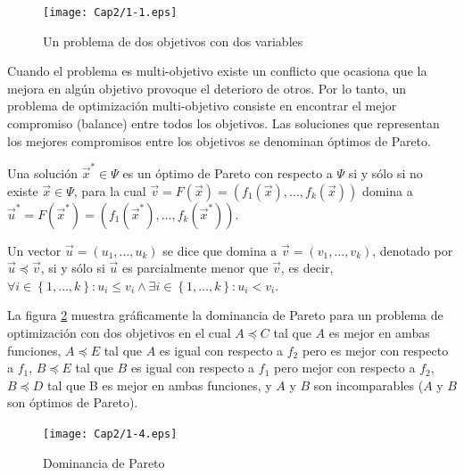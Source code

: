       \begin{figure}
	\centering
	\texttt{[image: Cap2/1-1.eps]}
	  \caption{Un problema de dos objetivos con dos variables}
      \label{fig:multiobj}
      \end{figure}
            
      Cuando el problema es multi-objetivo existe un conflicto que ocasiona que la mejora en alg\'un objetivo provoque 
      el deterioro de otros. Por lo tanto, un problema de optimizaci\'on multi-objetivo consiste en encontrar el mejor 
      compromiso (balance) entre todos los objetivos. Las soluciones que representan los mejores compromisos entre los 
      objetivos se denominan \'optimos de Pareto.  
      
      \begin{definicion}
	  Una soluci\'on $\vec{x}^*\in \Psi$ es un \'optimo de Pareto con respecto a $\Psi$ si y s\'olo si no existe 
	  $\vec{x}\in \Psi$, para la cual $\vec{v} = F\left(\vec{x}\right)=\left(f_1\left(\vec{x}\right), \ldots,f_k\left(\vec{x}\right) \right)$ 
	  domina a $\vec{u}^*=F\left(\vec{x}^*\right)=\left(f_1\left(\vec{x}^*\right), \ldots,f_k\left(\vec{x}^*\right) \right)$.
      \end{definicion}
      
      \begin{definicion}
	  Un vector $\vec{u} = \left(u_1, \ldots, u_k \right)$ se dice que domina a $\vec{v} = \left(v_1, \ldots, v_k \right)$,
	  denotado por $\vec{u} \preceq \vec{v}$, si y s\'olo si $\vec{u}$ es parcialmente menor que $\vec{v}$, es decir, 
	  $\forall i \in \left\{1, \ldots, k \right\}: u_i \leq v_i \wedge \exists i \in \left\{1, \ldots, k\right\}: u_i < v_i$.
      \end{definicion}
    
      La figura \ref{fig:paretodominance} muestra gr\'aficamente la dominancia de Pareto para un problema de optimizaci\'on
      con dos objetivos en el cual $A \preceq C$ tal que $A$ es mejor en ambas funciones, $A \preceq E$ tal que $A$ es igual con respecto 
      a $f_2$ pero es mejor con respecto a $f_1$, $B \preceq E$ tal que $B$  es igual con respecto a $f_1$ pero mejor con respecto a 
      $f_2$, $B\preceq D$ tal que B es mejor en ambas funciones, y $A$ y $B$ son incomparables ($A$ y $B$ son \'optimos de Pareto).
       
       \begin{figure}
	\centering
	\texttt{[image: Cap2/1-4.eps]}
	  \caption{Dominancia de Pareto}
      \label{fig:paretodominance}
      \end{figure}
       
